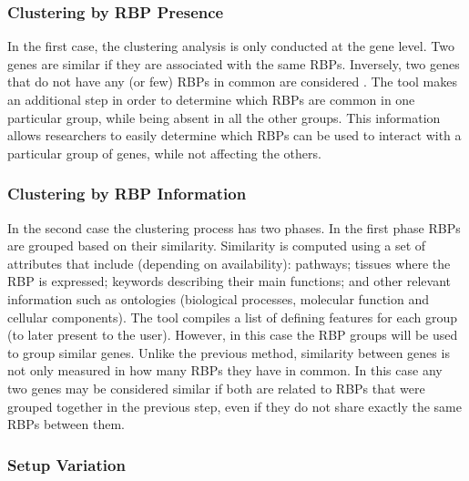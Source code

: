 \subsubsection*{Clustering by RBP Presence}

In the first case, the clustering analysis is only conducted at the gene level.
Two genes are similar if they are associated with the same RBPs. Inversely, two
genes that do not have any (or few) RBPs in common are considered . The
tool makes an additional step in order to determine which RBPs are common in one
particular group, while being absent in all the other groups. This information
allows researchers to easily determine which RBPs can be used to interact with a
particular group of genes, while not affecting the others.

\subsubsection*{Clustering by RBP Information}

In the second case the clustering process has two phases. In the first phase
RBPs are grouped based on their similarity. Similarity is computed using a set
of attributes that include (depending on availability): pathways; tissues where
the RBP is expressed; keywords describing their main functions; and other
relevant information such as ontologies (biological processes, molecular
function and cellular components). The tool compiles a list of defining features
for each group (to later present to the user). However, in this case the RBP
groups will be used to group similar genes. Unlike the previous method,
similarity between genes is not only measured in how many RBPs they have in
common. In this case any two genes may be considered similar if both are related
to RBPs that were grouped together in the previous step, even if they do not
share exactly the same RBPs between them.

\subsubsection*{Setup Variation}

